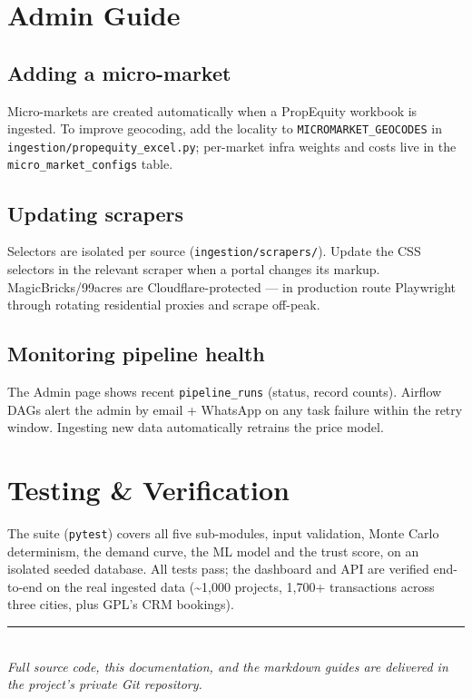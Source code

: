 \documentclass[11pt,a4paper]{article}
\begin{document}
\section{Admin Guide}
\subsection{Adding a micro-market}
Micro-markets are created automatically when a PropEquity workbook is ingested.
To improve geocoding, add the locality to \texttt{MICROMARKET\_GEOCODES} in
\texttt{ingestion/propequity\_excel.py}; per-market infra weights and costs live
in the \texttt{micro\_market\_configs} table.

\subsection{Updating scrapers}
Selectors are isolated per source (\texttt{ingestion/scrapers/}). Update the CSS
selectors in the relevant scraper when a portal changes its markup.
MagicBricks/99acres are Cloudflare-protected --- in production route Playwright
through rotating residential proxies and scrape off-peak.

\subsection{Monitoring pipeline health}
The Admin page shows recent \texttt{pipeline\_runs} (status, record counts).
Airflow DAGs alert the admin by email + WhatsApp on any task failure within the
retry window. Ingesting new data automatically retrains the price model.

\section{Testing \& Verification}
The suite (\texttt{pytest}) covers all five sub-modules, input validation,
Monte Carlo determinism, the demand curve, the ML model and the trust score, on
an isolated seeded database. All tests pass; the dashboard and API are verified
end-to-end on the real ingested data (\textasciitilde1{,}000 projects,
1{,}700+ transactions across three cities, plus GPL's CRM bookings).

\vspace{1cm}
\begin{center}
{\color{navy}\rule{0.5\textwidth}{0.8pt}}\\[4pt]
\textit{Full source code, this documentation, and the markdown guides are
delivered in the project's private Git repository.}
\end{center}
\end{document}
